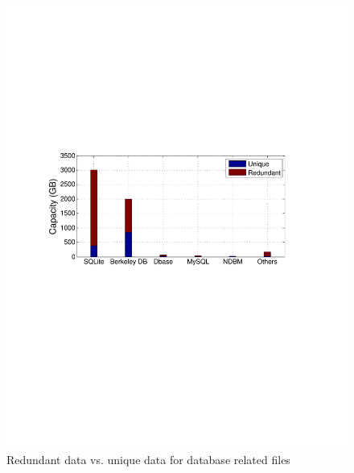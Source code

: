 \begin{figure}[t]
	\centering
	\begin{minipage}{0.35\textwidth}
		\centering
		\includegraphics[width=1\textwidth]{graphs/type-db-cap.pdf}
		\caption{Redundant data vs. unique data for database related files}
		\label{fig:type-db}
	\end{minipage}%
	\begin{minipage}{0.278\textwidth}
		\centering

\end{minipage}
\end{figure}
